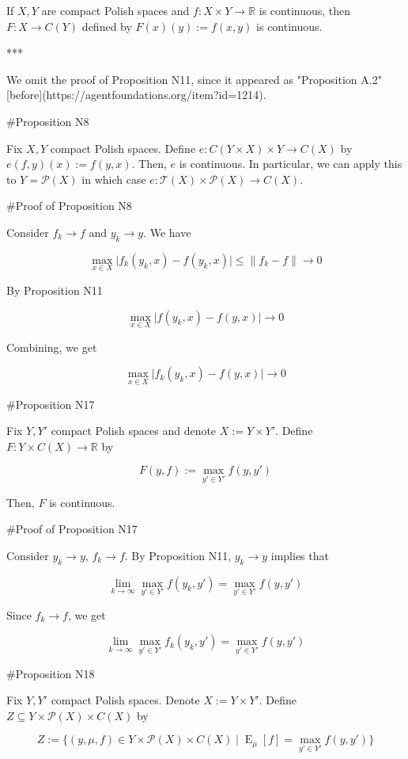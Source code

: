 \documentclass[a4paper]{article}
\DeclareMathOperator{\E}{E}
\newcommand{\Reals}{\mathbb{R}}
\newcommand{\Abs}[1]{\lvert #1 \rvert}
\newcommand{\Norm}[1]{\lVert #1 \rVert}
\newcommand{\Prob}{\mathcal{P}}
\newcommand{\T}{\mathcal{T}}
\begin{document}
If ${X,Y}$ are compact Polish spaces and ${f: X \times Y \rightarrow \Reals}$ is continuous, then ${F: X \rightarrow C(Y)}$ defined by ${F(x)(y):=f(x,y)}$ is continuous.

***

We omit the proof of Proposition N11, since it appeared as "Proposition A.2" [before](https://agentfoundations.org/item?id=1214).

\#Proposition N8

Fix ${X,Y}$ compact Polish spaces. Define ${e: C(Y \times X) \times Y \rightarrow C(X)}$ by ${e(f,y)(x):=f(y,x)}$. Then, ${e}$ is continuous. In particular, we can apply this to ${Y = \Prob(X)}$ in which case ${e: \T(X) \times \Prob(X) \rightarrow C(X)}$.

\#Proof of Proposition N8

Consider ${f_k \rightarrow f}$ and ${y_k \rightarrow y}$. We have

$$\max_{x \in X} \Abs{f_k(y_k,x)-f(y_k,x)} \leq \Norm{f_k - f} \rightarrow 0$$

By Proposition N11

$$\max_{x \in X} \Abs{f(y_k,x)-f(y,x)} \rightarrow 0$$

Combining, we get

$$\max_{x \in X} \Abs{f_k(y_k,x)-f(y,x)} \rightarrow 0$$

\#Proposition N17

Fix ${Y,Y'}$ compact Polish spaces and denote ${X:=Y \times Y'}$. Define ${F: Y \times C(X) \rightarrow \Reals}$ by 

$${F(y,f):=\max_{y' \in Y'} f(y,y')}$$

Then, ${F}$ is continuous.

\#Proof of Proposition N17

Consider ${y_k \rightarrow y}$, ${f_k \rightarrow f}$. By Proposition N11, ${y_k \rightarrow y}$ implies that

$${\lim_{k \rightarrow \infty} \max_{y' \in Y'} f(y_k,y') = \max_{y' \in Y'} f(y,y')}$$

Since ${f_k \rightarrow f}$, we get

$${\lim_{k \rightarrow \infty} \max_{y' \in Y'} f_k(y_k,y') = \max_{y' \in Y'} f(y,y')}$$

\#Proposition N18

Fix ${Y,Y'}$ compact Polish spaces. Denote ${X:=Y \times Y'}$. Define ${Z \subseteq Y \times \Prob(X) \times C(X)}$ by

$$Z:=\{(y,\mu,f) \in Y \times \Prob(X) \times C(X) \mid \E_\mu[f] = \max_{y' \in Y'} f(y,y')\}$$
\end{document}
